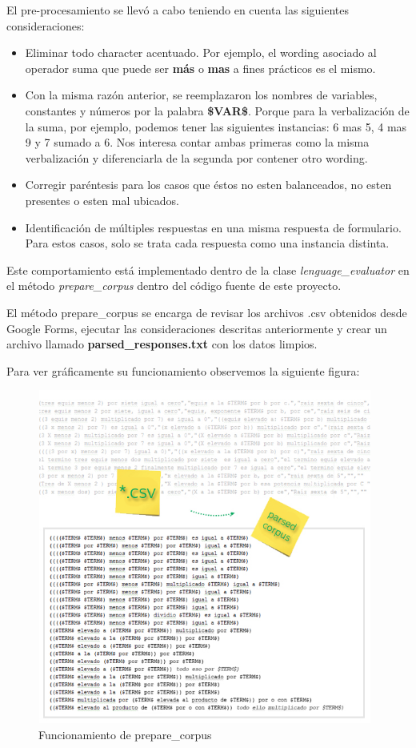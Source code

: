 El pre-procesamiento se llevó a cabo teniendo en cuenta las siguientes consideraciones:

\begin{itemize}
   \item Eliminar todo character acentuado. Por ejemplo, el wording asociado al operador suma que puede ser \textbf{más} o \textbf{mas} a fines prácticos es el mismo.
   \item Con la misma razón anterior, se reemplazaron los nombres de variables, constantes y números por la palabra \textbf{\$VAR\$}. Porque para la verbalización de la suma, por ejemplo, podemos tener las siguientes instancias: 6 mas 5, 4 mas 9 y 7 sumado a 6. Nos interesa contar ambas primeras como la misma verbalización y diferenciarla de la segunda por contener otro wording.
   \item Corregir paréntesis para los casos que éstos no esten balanceados, no esten presentes o esten mal ubicados.
   \item Identificación de múltiples respuestas en una misma respuesta de formulario. Para estos casos, solo se trata cada respuesta como una instancia distinta.
\end{itemize}

Este comportamiento está implementado dentro de la clase \textit{lenguage\_evaluator} en el método \textit{prepare\_corpus} dentro del código fuente de este proyecto.

El método prepare\_corpus se encarga de revisar los archivos .csv obtenidos desde Google Forms, ejecutar las consideraciones descritas anteriormente y crear un archivo llamado \textbf{parsed\_responses.txt} con los datos limpios.

Para ver gráficamente su funcionamiento observemos la siguiente figura:

\begin{figure}[H]
\centering
  \includegraphics[width=11cm, height=11cm]{Figures/parsed_corpus}
  \caption[]{Funcionamiento de prepare\_corpus}
\label{fig:parsed_corpus}
\end{figure}


